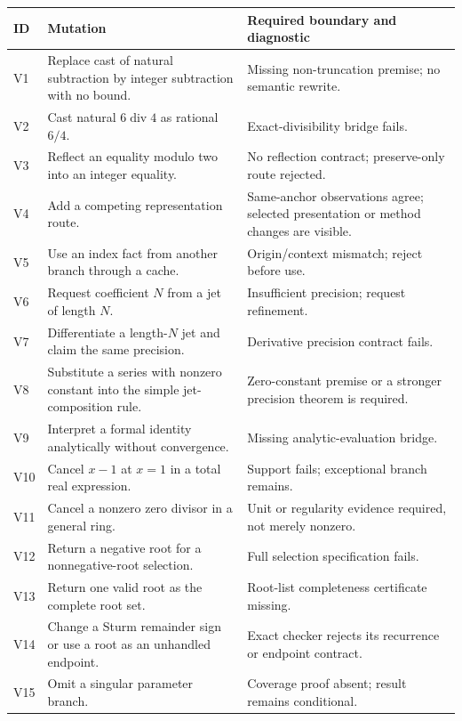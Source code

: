 \documentclass[11pt,a4paper]{article}
\theoremstyle{definition}
\begin{document}
\small
{}
\begin{longtable}{@{}P{.07\textwidth}P{.44\textwidth}P{.40\textwidth}@{}}
\toprule
ID & Mutation & Required boundary and diagnostic\\
\midrule\endhead
V1 & Replace cast of natural subtraction by integer subtraction with no bound. & Missing non-truncation premise; no semantic rewrite.\\
V2 & Cast natural \(6\operatorname{div}4\) as rational \(6/4\). & Exact-divisibility bridge fails.\\
V3 & Reflect an equality modulo two into an integer equality. & No reflection contract; preserve-only route rejected.\\
V4 & Add a competing representation route. & Same-anchor observations agree; selected presentation or method changes are visible.\\
V5 & Use an index fact from another branch through a cache. & Origin/context mismatch; reject before use.\\
V6 & Request coefficient \(N\) from a jet of length \(N\). & Insufficient precision; request refinement.\\
V7 & Differentiate a length-\(N\) jet and claim the same precision. & Derivative precision contract fails.\\
V8 & Substitute a series with nonzero constant into the simple jet-composition rule. & Zero-constant premise or a stronger precision theorem is required.\\
V9 & Interpret a formal identity analytically without convergence. & Missing analytic-evaluation bridge.\\
V10 & Cancel \(x-1\) at \(x=1\) in a total real expression. & Support fails; exceptional branch remains.\\
V11 & Cancel a nonzero zero divisor in a general ring. & Unit or regularity evidence required, not merely nonzero.\\
V12 & Return a negative root for a nonnegative-root selection. & Full selection specification fails.\\
V13 & Return one valid root as the complete root set. & Root-list completeness certificate missing.\\
V14 & Change a Sturm remainder sign or use a root as an unhandled endpoint. & Exact checker rejects its recurrence or endpoint contract.\\
V15 & Omit a singular parameter branch. & Coverage proof absent; result remains conditional.\\

\end{longtable}
\end{document}
